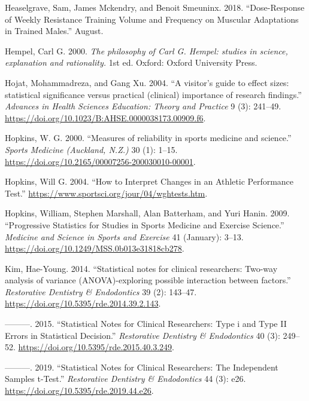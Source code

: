 \documentclass[
  letterpaper,
  DIV=11,
  numbers=noendperiod]{scrreprt}
\newlength{\cslhangindent}
\newlength{\cslentryspacingunit} %
\newenvironment{CSLReferences}[2] %
 {%
  \setlength{\parindent}{0pt}
  \ifodd #1
  \let\oldpar\par
  \def\par{\hangindent=\cslhangindent\oldpar}
  \fi
  \setlength{\parskip}{#2\cslentryspacingunit}
 }%
 {}
\begin{document}
\begin{CSLReferences}{1}{0}
\leavevmode{}%
Heaselgrave, Sam, James Mckendry, and Benoit Smeuninx. 2018.
{``Dose-Response of Weekly Resistance Training Volume and Frequency on
Muscular Adaptations in Trained Males.''} August.

\leavevmode{}%
Hempel, Carl G. 2000. \emph{The philosophy of Carl G. Hempel: studies in
science, explanation and rationality.} 1st ed. Oxford: Oxford University
Press.

\leavevmode{}%
Hojat, Mohammadreza, and Gang Xu. 2004. {``A visitor's guide to effect
sizes: statistical significance versus practical (clinical) importance
of research findings.''} \emph{Advances in Health Sciences Education:
Theory and Practice} 9 (3): 241--49.
\url{https://doi.org/10.1023/B:AHSE.0000038173.00909.f6}.

\leavevmode{}%
Hopkins, W. G. 2000. {``Measures of reliability in sports medicine and
science.''} \emph{Sports Medicine (Auckland, N.Z.)} 30 (1): 1--15.
\url{https://doi.org/10.2165/00007256-200030010-00001}.

\leavevmode{}%
Hopkins, Will G. 2004. {``How to Interpret Changes in an Athletic
Performance Test.''}
\url{https://www.sportsci.org/jour/04/wghtests.htm}.

\leavevmode{}%
Hopkins, William, Stephen Marshall, Alan Batterham, and Yuri Hanin.
2009. {``Progressive Statistics for Studies in Sports Medicine and
Exercise Science.''} \emph{Medicine and Science in Sports and Exercise}
41 (January): 3--13. \url{https://doi.org/10.1249/MSS.0b013e31818cb278}.

\leavevmode{}%
Kim, Hae-Young. 2014. {``Statistical notes for clinical researchers:
Two-way analysis of variance (ANOVA)-exploring possible interaction
between factors.''} \emph{Restorative Dentistry \& Endodontics} 39 (2):
143--47. \url{https://doi.org/10.5395/rde.2014.39.2.143}.

\leavevmode{}%
---------. 2015. {``Statistical Notes for Clinical Researchers: Type i
and Type II Errors in Statistical Decision.''} \emph{Restorative
Dentistry \& Endodontics} 40 (3): 249--52.
\url{https://doi.org/10.5395/rde.2015.40.3.249}.

\leavevmode{}%
---------. 2019. {``Statistical Notes for Clinical Researchers: The
Independent Samples t-Test.''} \emph{Restorative Dentistry \&
Endodontics} 44 (3): e26. \url{https://doi.org/10.5395/rde.2019.44.e26}.


\end{CSLReferences}
\end{document}
